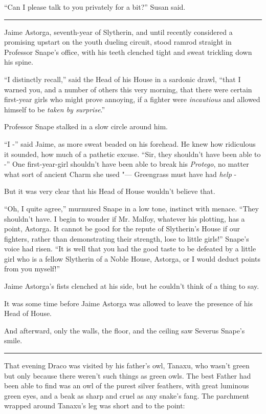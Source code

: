 ``Can I please talk to you privately for a bit?'' Susan said.

\begin{center}\rule{3in}{0.4pt}\end{center}

Jaime Astorga, seventh-year of Slytherin, and until recently considered
a promising upstart on the youth dueling circuit, stood ramrod straight
in Professor Snape's office, with his teeth clenched tight and sweat
trickling down his spine.

``I distinctly recall,'' said the Head of his House in a sardonic drawl,
``that I warned you, and a number of others this very morning, that there
were certain first-year girls who might prove annoying, if a fighter
were \emph{incautious} and allowed himself to be \emph{taken by
surprise}.''

Professor Snape stalked in a slow circle around him.

``I -'' said Jaime, as more sweat beaded on his forehead. He knew how
ridiculous it sounded, how much of a pathetic excuse. ``Sir, they
shouldn't have been able to -'' One first-year-girl shouldn't have been
able to break his \emph{Protego}, no matter what sort of ancient Charm
she used "--- Greengrass must have had \emph{help} -

But it was very clear that his Head of House wouldn't believe that.

``Oh, I quite agree,'' murmured Snape in a low tone, instinct with
menace. ``They shouldn't have. I begin to wonder if Mr. Malfoy, whatever
his plotting, has a point, Astorga. It cannot be good for the repute of
Slytherin's House if our fighters, rather than demonstrating their
strength, lose to little girls!'' Snape's voice had risen. ``It is well
that you had the good taste to be defeated by a little girl who is a
fellow Slytherin of a Noble House, Astorga, or I would deduct points
from you myself!''

Jaime Astorga's fists clenched at his side, but he couldn't think of a
thing to say.

It was some time before Jaime Astorga was allowed to leave the presence
of his Head of House.

And afterward, only the walls, the floor, and the ceiling saw Severus
Snape's smile.

\begin{center}\rule{3in}{0.4pt}\end{center}

That evening Draco was visited by his father's owl, Tanaxu, who wasn't
green but only because there weren't such things as green owls. The best
Father had been able to find was an owl of the purest silver feathers,
with great luminous green eyes, and a beak as sharp and cruel as any
snake's fang. The parchment wrapped around Tanaxu's leg was short and to
the point:

